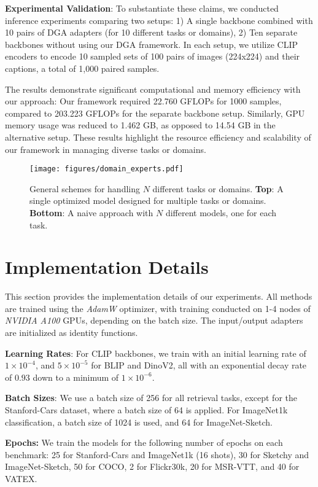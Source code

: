 {\bf Experimental Validation}: To substantiate these claims, we conducted inference experiments comparing two setups: 1) A single backbone combined with 10 pairs of DGA adapters (for 10 different tasks or domains), 2) Ten separate backbones without using our DGA framework.
In each setup, we utilize CLIP encoders to encode 10 sampled sets of 100 pairs of images (224x224) and their captions, a total of 1,000 paired samples. 

The results demonstrate significant computational and memory efficiency with our approach:
Our framework required 22.760 GFLOPs for 1000 samples, compared to 203.223 GFLOPs for the separate backbone setup. Similarly, GPU memory usage was reduced to 1.462 GB, as opposed to 14.54 GB in the alternative setup. These results highlight the resource efficiency and scalability of our framework in managing diverse tasks or domains.


\begin{figure}[ht]
	\centering
	\texttt{[image: figures/domain\_experts.pdf]}
	\caption{General schemes for handling $N$ different tasks or domains. {\bf Top}: A single optimized model designed for multiple tasks or domains. {\bf Bottom}: A naive approach with $N$ different models, one for each task.}
	\label{fig:domain_experts}
\end{figure}

\section{Implementation Details}
\label{sec:further_implementation_details}
This section provides the implementation details of our experiments. All methods are trained using the {\it AdamW} optimizer, with training conducted on 1-4 nodes of {\it NVIDIA A100} GPUs, depending on the batch size. The input/output adapters are initialized as identity functions.
 

{\bf Learning Rates}: For CLIP backbones, we train \ours with an initial learning rate of $1\times 10^{-4}$, and $5\times 10^{-5}$ for BLIP and DinoV2, all with an exponential decay rate of $0.93$ down to a minimum of $1\times 10^{-6}$.

{\bf Batch Sizes}: We use a batch size of 256 for all retrieval tasks, except for the Stanford-Cars dataset, where a batch size of 64 is applied. For ImageNet1k classification, a batch size of 1024 is used, and 64 for ImageNet-Sketch.

\textbf{Epochs:} We train the models for the following number of epochs on each benchmark: 25 for Stanford-Cars and ImageNet1k (16 shots), 30 for Sketchy and ImageNet-Sketch, 50 for COCO, 2 for Flickr30k, 20 for MSR-VTT, and 40 for VATEX.

